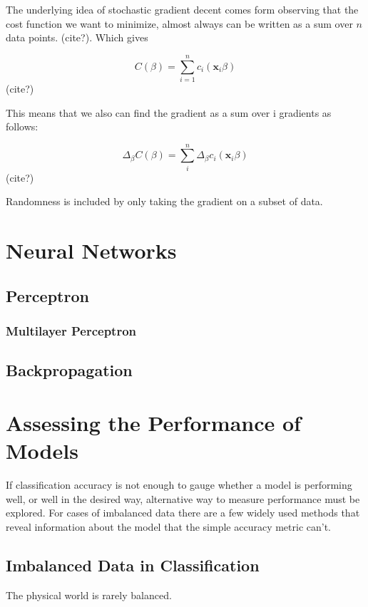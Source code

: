 The underlying idea of stochastic gradient decent comes form observing
that the cost function we want to minimize, almost always can be written as
a sum over \(n\) data points. (cite?). Which gives

\begin{equation}
	C(\beta) = \sum\limits_{i=1}^n c_i (\mathbf{x}_i\beta)
\end{equation} (cite?)

This means that we also can find the gradient as a sum over i gradients
as follows:

\begin{equation}
	\Delta_{\beta} C(\beta) = \sum\limits_{i}^n \Delta_{\beta}c_i (\mathbf{x}_i\beta)
\end{equation} (cite?)

Randomness is included by only taking the gradient on a subset of data.

\section{Neural Networks}
\subsection{Perceptron}

\subsubsection{Multilayer Perceptron}

\subsection{Backpropagation}

\section{Assessing the Performance of Models}
If classification accuracy is not enough to gauge whether a model is
performing well, or well in the desired way, alternative way to measure
performance must be explored. For cases of imbalanced data there are a few
widely used methods that reveal information about the model that the simple
accuracy metric can't.

\subsection{Imbalanced Data in Classification}
The physical world is rarely balanced.

